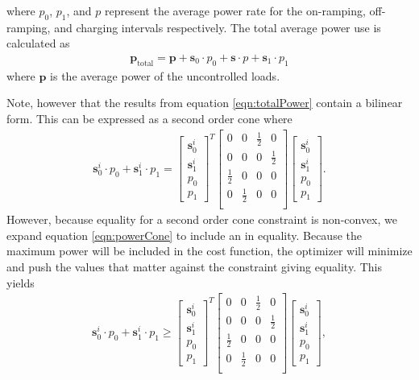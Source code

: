 \documentclass{article}
\begin{document}
where $p_0$, $p_1$, and $p$ represent the average power rate for the on-ramping, off-ramping, and charging intervals respectively.
The total average power use is calculated as 
\begin{align}\label{eqn:totalPower}
	\mathbf{p}_{\text{total}} = \mathbf{p} + \mathbf{s}_0\cdot p_0 + \mathbf{s}\cdot p + \mathbf{s}_1\cdot p_1
\end{align}
where $\mathbf{p}$ is the average power of the uncontrolled loads.
\par Note, however that the results from equation \ref{eqn:totalPower} contain a bilinear form.  This can be expressed as a second order cone where
\begin{align}\label{eqn:powerCone} 
	\mathbf{s}_0^i\cdot p_0 + \mathbf{s}_1^i\cdot p_1 = \begin{bmatrix}\mathbf{s}_0^i \\ \mathbf{s}_1^i \\ p_0 \\ p_1 \end{bmatrix}^T
		\begin{bmatrix}0 & 0 & \frac{1}{2} & 0\\
			0 & 0 & 0 & \frac{1}{2}\\
			       \frac{1}{2} & 0 & 0 & 0\\ 
			       0 & \frac{1}{2} & 0 & 0\\ 
		\end{bmatrix}
\begin{bmatrix}\mathbf{s}_0^i \\ \mathbf{s}_1^i \\ p_0 \\ p_1 \end{bmatrix}.
\end{align}
However, because equality for a second order cone constraint is non-convex, we expand equation \ref{eqn:powerCone} to include an in equality.  Because the maximum power will be included in the cost function, the optimizer will minimize and push the values that matter against the constraint giving equality. This yields
\begin{align}
\mathbf{s}_0^i\cdot p_0 + \mathbf{s}_1^i\cdot p_1 \ge \begin{bmatrix}\mathbf{s}_0^i \\ \mathbf{s}_1^i \\ p_0 \\ p_1 \end{bmatrix}^T
		\begin{bmatrix}0 & 0 & \frac{1}{2} & 0\\
			0 & 0 & 0 & \frac{1}{2}\\
			       \frac{1}{2} & 0 & 0 & 0\\ 
			       0 & \frac{1}{2} & 0 & 0\\ 
		\end{bmatrix}
\begin{bmatrix}\mathbf{s}_0^i \\ \mathbf{s}_1^i \\ p_0 \\ p_1 \end{bmatrix},  
\end{align}
\end{document}
